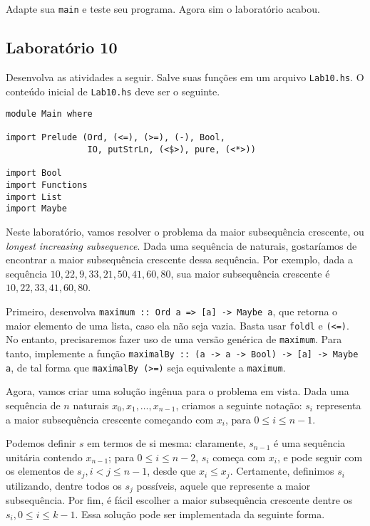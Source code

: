\documentclass[a4paper]{article}
\begin{document}
Adapte sua \texttt{main} e teste seu programa.
Agora sim o laboratório acabou.

\subsection{Laboratório 10}

Desenvolva as atividades a seguir.
Salve suas funções em um arquivo \texttt{Lab10.hs}.
O conteúdo inicial de \texttt{Lab10.hs} deve ser o seguinte.

\begin{verbatim}
module Main where

import Prelude (Ord, (<=), (>=), (-), Bool,
                IO, putStrLn, (<$>), pure, (<*>))

import Bool
import Functions
import List
import Maybe
\end{verbatim}

Neste laboratório, vamos resolver o problema da maior subsequência crescente, ou \emph{longest increasing subsequence}.
Dada uma sequência de naturais, gostaríamos de encontrar a maior subsequência crescente dessa sequência.
Por exemplo, dada a sequência $10, 22, 9, 33, 21, 50, 41, 60, 80$, sua maior subsequência crescente é $10, 22, 33, 41, 60, 80$.

Primeiro, desenvolva \texttt{maximum :: Ord a => [a] -> Maybe a}, que retorna o maior elemento de uma lista, caso ela não seja vazia.
Basta usar \texttt{foldl} e \texttt{(<=)}.
No entanto, precisaremos fazer uso de uma versão genérica de \texttt{maximum}.
Para tanto, implemente a função \mbox{\texttt{maximalBy :: (a -> a -> Bool) -> [a] -> Maybe a}}, de tal forma que \texttt{maximalBy (>=)} seja equivalente a \texttt{maximum}.

Agora, vamos criar uma solução ingênua para o problema em vista.
Dada uma sequência de $n$ naturais $x_0, x_1, \dots, x_{n - 1}$, criamos a seguinte notação:
$s_i$ representa a maior subsequência crescente começando com $x_i$, para $0 \leq i \leq n - 1$.

Podemos definir $s$ em termos de si mesma:
claramente, $s_{n - 1}$ é uma sequência unitária contendo $x_{n - 1}$;
para $0 \leq i \leq n - 2$, $s_i$ começa com $x_i$, e pode seguir com os elementos de $s_j, i < j \leq n - 1$, desde que $x_i \leq x_j$.
Certamente, definimos $s_i$ utilizando, dentre todos os $s_j$ possíveis, aquele que represente a maior subsequência.
Por fim, é fácil escolher a maior subsequência crescente dentre os $s_i, 0 \leq i \leq k - 1$.
Essa solução pode ser implementada da seguinte forma.
\end{document}
